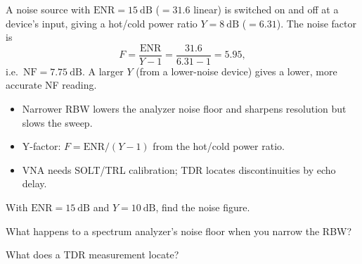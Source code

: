 \begin{workedexample}
A noise source with $\text{ENR} = 15\ \text{dB}$ ($=31.6$ linear) is
switched on and off at a device's input, giving a hot/cold power ratio
$Y = 8\ \text{dB}$ ($=6.31$). The noise factor is
\[ F = \frac{\text{ENR}}{Y - 1} = \frac{31.6}{6.31 - 1} = 5.95, \]
i.e.\ $\text{NF} = 7.75\ \text{dB}$. A larger $Y$ (from a lower-noise device)
gives a lower, more accurate NF reading.
\end{workedexample}

\begin{keytakeaways}
\begin{itemize}[leftmargin=1.4em,itemsep=2pt]
\item Narrower RBW lowers the analyzer noise floor and sharpens resolution but slows the sweep.
\item Y-factor: $F = \text{ENR}/(Y-1)$ from the hot/cold power ratio.
\item VNA needs SOLT/TRL calibration; TDR locates discontinuities by echo delay.
\end{itemize}
\end{keytakeaways}

\begin{exercises}
\item With $\text{ENR} = 15\ \text{dB}$ and $Y = 10\ \text{dB}$, find the noise figure.
\item What happens to a spectrum analyzer's noise floor when you narrow the RBW?
\item What does a TDR measurement locate?
\end{exercises}

